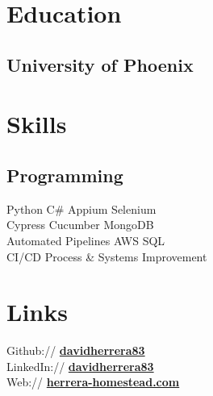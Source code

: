 \documentclass[hmargin=1.25cm,vmargin=0.75cm,scale=0.9]{deedy-resume-openfont}
\begin{document}
%
%
\lastupdated
%
%

%
%
\begin{minipage}[t]{0.33\textwidth} 

\section{Education} 
\subsection{University of Phoenix}
\sectionsep

\section{Skills}
\subsection{Programming}
Python \textbullet{} C\# \textbullet{} Appium \textbullet{} Selenium \\
Cypress \textbullet{} Cucumber \textbullet{} MongoDB \\
Automated Pipelines \textbullet{} AWS \textbullet{} SQL \\
CI/CD \textbullet{} Process \& Systems Improvement\\
\sectionsep

\section{Links} 
Github:// \href{https://github.com/davidherrera83}{\bf davidherrera83} \\
LinkedIn:// \href{https://www.linkedin.com/in/davidherrera83}{\bf davidherrera83} \\
Web:// \href{https://www.herrera-homestead.com}{\bf herrera-homestead.com} \\
\sectionsep


\end{minipage}
\end{document}
